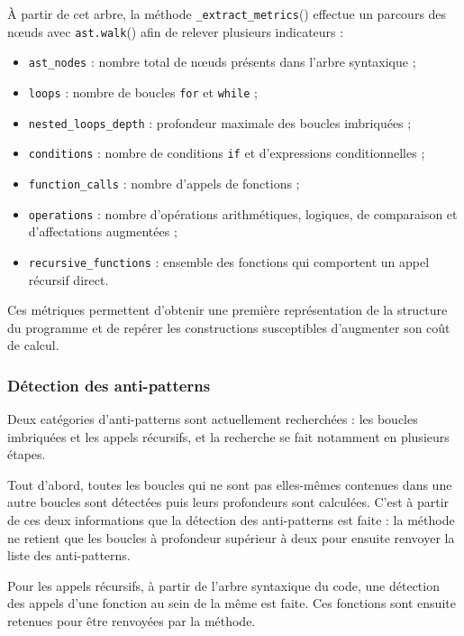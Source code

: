 \documentclass[a4paper,12pt]{article}
\providecommand{\tightlist}{\setlength{\itemsep}{0pt}\setlength{\parskip}{0pt}}
\providecommand{\tightlist}{}
\begin{document}
À partir de cet arbre, la méthode
\texttt{\_\allowbreak{}extract\_\allowbreak{}metrics}() effectue un
parcours des nœuds avec \texttt{ast.walk}() afin de relever plusieurs
indicateurs :

\begin{itemize}
\tightlist
\item
  \texttt{ast\_nodes} : nombre total de nœuds présents dans l'arbre
  syntaxique ;
\item
  \texttt{loops} : nombre de boucles \texttt{for} et \texttt{while} ;
\item
  \texttt{nested\_\allowbreak{}loops\_\allowbreak{}depth} : profondeur
  maximale des boucles imbriquées ;
\item
  \texttt{conditions} : nombre de conditions \texttt{if} et
  d'expressions conditionnelles ;
\item
  \texttt{function\_\allowbreak{}calls} : nombre d'appels de fonctions ;
\item
  \texttt{operations} : nombre d'opérations arithmétiques, logiques, de
  comparaison et d'affectations augmentées ;
\item
  \texttt{recursive\_\allowbreak{}functions} : ensemble des fonctions
  qui comportent un appel récursif direct.
\end{itemize}

Ces métriques permettent d'obtenir une première représentation de la
structure du programme et de repérer les constructions susceptibles
d'augmenter son coût de calcul.

\subsubsection{Détection des
anti-patterns}\label{duxe9tection-des-anti-patterns}

Deux catégories d'anti-patterns sont actuellement recherchées : les
boucles imbriquées et les appels récursifs, et la recherche se fait
notamment en plusieurs étapes.

Tout d'abord, toutes les boucles qui ne sont pas elles-mêmes contenues
dans une autre boucles sont détectées puis leurs profondeurs sont
calculées. C'est à partir de ces deux informations que la détection des
anti-patterns est faite : la méthode ne retient que les boucles à
profondeur supérieur à deux pour ensuite renvoyer la liste des
anti-patterns.

Pour les appels récursifs, à partir de l'arbre syntaxique du code, une
détection des appels d'une fonction au sein de la même est faite. Ces
fonctions sont ensuite retenues pour être renvoyées par la méthode.
\end{document}

